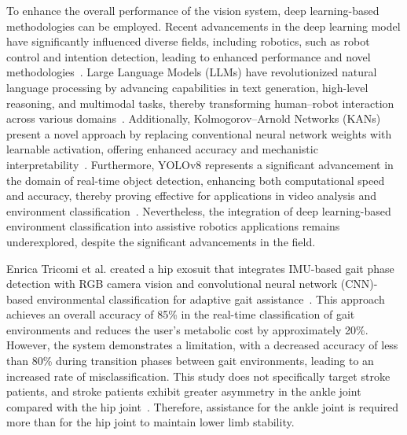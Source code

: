 \documentclass[actuators,article,accept,pdftex,moreauthors]{Definitions/mdpi}
\begin{document}
{To enhance the overall performance of the vision system, deep learning-based methodologies can be employed. Recent advancements in the deep learning model have significantly influenced diverse fields, including robotics, such as robot control and intention detection, leading to enhanced performance and novel methodologies~\cite{Coser2024}. Large Language Models (LLMs) have revolutionized natural language processing by advancing capabilities in text generation, high-level reasoning, and multimodal tasks, thereby transforming human--robot interaction across various domains~\cite{Zhao2023,Zhang2023}. Additionally, Kolmogorov--Arnold Networks (KANs) present a novel approach by replacing conventional neural network weights with learnable activation, offering enhanced accuracy and mechanistic interpretability~\cite{Liu2024,Cheon2024}. Furthermore, YOLOv8 represents a significant advancement in the domain of real-time object detection, enhancing both computational speed and accuracy, thereby proving effective for applications in video analysis and environment classification~\cite{Sohan2024,Hussain2023}. Nevertheless, the integration of deep learning-based environment classification into assistive robotics applications remains underexplored, despite the significant advancements in the field.}

Enrica Tricomi et al. created a hip exosuit that integrates IMU-based gait phase detection with RGB camera vision and convolutional neural network (CNN)-based environmental classification for adaptive gait assistance~\cite{Tricomi2023}. This approach achieves an overall accuracy of 85\% in the real-time classification of gait environments and reduces the user's metabolic cost by approximately 20\%. However, the system demonstrates a limitation, with a decreased accuracy of less than 80\% during transition phases between gait environments, leading to an increased rate of misclassification. This study does not specifically target stroke patients, and stroke patients exhibit greater asymmetry in the ankle joint compared with the hip joint~\cite{Ogihara2020}. Therefore, assistance for the ankle joint is required more than for the hip joint to maintain lower limb stability.
\end{document}
